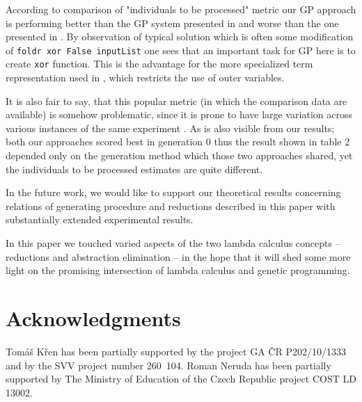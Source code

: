 \documentclass{sig-alternate}
\newcommand{\red}[1]{{\color{red} #1}}
\begin{document}
According to comparison of "individuals to be processed" metric our GP approach is performing better than the GP system presented in \cite{kes} and worse than the one presented in \cite{yu01}. By observation of typical solution which is often some modification of \texttt{foldr xor False inputList} one sees that an important task for GP here is to create \texttt{xor} function. This is the advantage for the more specialized term representation used in \cite{yu01}, which restricts the use of outer variables. 

It is also fair to say, that this popular metric (in which the comparison data are available) is somehow problematic, since it is prone to have large variation across various instances of the same experiment \cite{luke2002perfect}. As is also visible from our results; both our approaches scored best in generation 0 thus the result shown in table 2 depended only on the generation method which those two approaches shared, yet the individuals to be processed estimates are quite different.

In the future work, we would like to support our theoretical results concerning relations of generating procedure and reductions described in this paper with substantially extended experimental results.

In this paper we touched varied aspects of the two lambda calculus concepts -- reductions and abstraction elimination -- in the hope that it will shed some more light on the promising intersection of lambda calculus and genetic programming.




\vfill

\section{Acknowledgments}

Tomáš Křen has been partially supported by the project GA ČR P202/10/1333 and by the SVV project number 260~104. Roman Neruda has been partially supported by The Ministry of Education of the Czech Republic project COST LD 13002.


%
%


\end{document}
